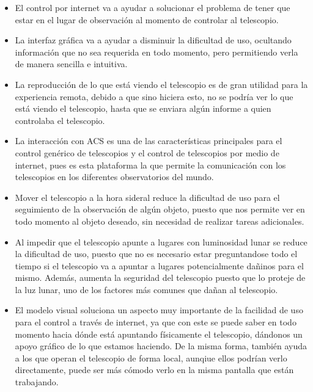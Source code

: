 \documentclass[letterpaper,titlepage,spanish,10pt]{article}
\begin{document}
	\begin{itemize}

	\item El control por internet va a ayudar a solucionar el problema de tener 
que estar en el lugar de observaci\'on al momento de controlar al telescopio.

	\item La interfaz gr\'afica va a ayudar a disminuir la dificultad de uso, 
ocultando informaci\'on que no sea requerida en todo momento, pero permitiendo 
verla de manera sencilla e intuitiva.

	\item La reproducci\'on de lo que est\'a viendo el telescopio es de gran 
utilidad para la experiencia remota, debido a que sino hiciera esto, no se podr\'ia 
ver lo que est\'a viendo el telescopio, hasta que se enviara alg\'un informe a 
quien controlaba el telescopio.

	\item La interacci\'on con ACS es una de las caracter\'isticas principales 
para el control gen\'erico de telescopios y el control de telescopios por medio 
de internet, pues es esta plataforma la que permite la comunicaci\'on con los 
telescopios en los diferentes observatorios del mundo.

	\item Mover el telescopio a la hora sideral reduce la dificultad de uso 
para el seguimiento de la observaci\'on de alg\'un objeto, puesto que nos permite 
ver en todo momento al objeto deseado, sin necesidad de realizar tareas adicionales.

	\item Al impedir que el telescopio apunte a lugares con luminosidad lunar 
se reduce la dificultad de uso, puesto que no es necesario estar preguntandose 
todo el tiempo si el telescopio va a apuntar a lugares potencialmente da\~ninos 
para el mismo. Adem\'as, aumenta la seguridad del telescopio puesto que lo proteje 
de la luz lunar, uno de los factores m\'as comunes que da\~nan al telescopio.

	\item El modelo visual soluciona un aspecto muy importante de la facilidad 
de uso para el control a trav\'es de internet, ya que con este se puede saber en 
todo momento hacia d\'onde est\'a apuntando f\'isicamente el telescopio, d\'andonos 
un apoyo gr\'afico de lo que estamos haciendo. De la misma forma, tambi\'en ayuda 
a los que operan el telescopio de forma local, aunqiue ellos podr\'ian verlo 
directamente, puede ser m\'as c\'omodo verlo en la misma pantalla que est\'an trabajando.


\end{itemize}
\end{document}
